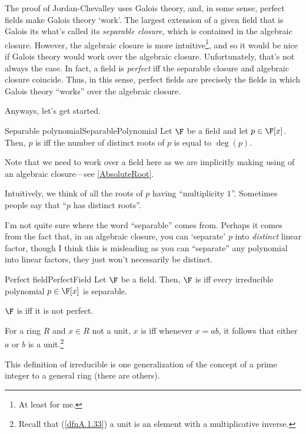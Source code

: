 The proof of Jordan-Chevalley uses Galois theory, and, in some sense, perfect fields make Galois theory `work'.  The largest extension of a given field that is Galois its what's called its \emph{separable closure}, which is contained in the algebraic closure.  However, the algebraic closure is more intuitive\footnote{At least for me.}, and so it would be nice if Galois theory would work over the algebraic closure.  Unfortunately, that's not always the case.  In fact, a field is \emph{perfect} iff the separable closure and algebraic closure coincide.  Thus, in this sense, perfect fields are precisely the fields in which Galois theory ``works'' over the algebraic closure.

Anyways, let's get started.
\begin{dfn}{Separable polynomial}{SeparablePolynomial}
	Let $\F$ be a field and let $p\in \F [x]$.  Then, $p$ is  iff the number of distinct roots of $p$ is equal to $\deg (p)$.
	\begin{rmk}
		Note that we need to work over a field here as we are implicitly making using of an algebraic closure---see \cref{AbsoluteRoot}.
	\end{rmk}
	\begin{rmk}
		Intuitively, we think of all the roots of $p$ having ``multiplicity $1$''.  Sometimes people say that ``$p$ has distinct roots''.
	\end{rmk}
	\begin{rmk}
		I'm not quite sure where the word ``separable'' comes from.  Perhaps it comes from the fact that, in an algebraic closure, you can `separate' $p$ into \emph{distinct} linear factor, though I think this is misleading as you can ``separate'' any polynomial into linear factors, they just won't necessarily be distinct.
	\end{rmk}
\end{dfn}
\begin{dfn}{Perfect field}{PerfectField}
	Let $\F$ be a field.  Then, $\F$ is  iff every irreducible polynomial $p\in \F [x]$ is separable.
	
	$\F$ is  iff it is not perfect.
	\begin{rmk}
		For a ring $R$ and $x\in R$ not a unit, $x$ is  iff whenever $x=ab$, it follows that either $a$ or $b$ is a unit.\footnote{Recall that (\cref{dfnA.1.33}) a unit is an element with a multiplicative inverse.}
		
		This definition of irreducible is one generalization of the concept of a prime integer to a general ring (there are others).
	\end{rmk}
\end{dfn}
